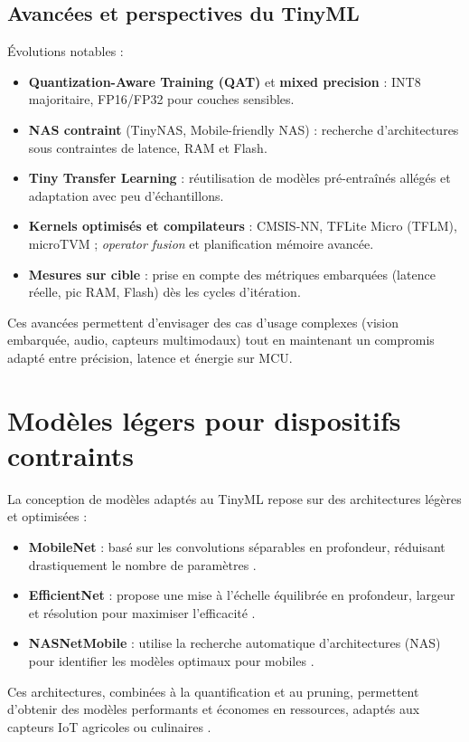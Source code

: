 \subsection{Avancées et perspectives du TinyML}
Évolutions notables :
\begin{itemize}
    \item \textbf{Quantization-Aware Training (QAT)} et \textbf{mixed precision} : INT8 majoritaire, FP16/FP32 pour couches sensibles.
    \item \textbf{NAS contraint} (TinyNAS, Mobile-friendly NAS) : recherche d’architectures sous contraintes de latence, RAM et Flash.
    \item \textbf{Tiny Transfer Learning} : réutilisation de modèles pré-entraînés allégés et adaptation avec peu d’échantillons.
    \item \textbf{Kernels optimisés et compilateurs} : CMSIS-NN, TFLite Micro (TFLM), microTVM ; \emph{operator fusion} et planification mémoire avancée.
    \item \textbf{Mesures sur cible} : prise en compte des métriques embarquées (latence réelle, pic RAM, Flash) dès les cycles d’itération.
\end{itemize}
Ces avancées permettent d’envisager des cas d’usage complexes (vision embarquée, audio, capteurs multimodaux) tout en maintenant un compromis adapté entre précision, latence et énergie sur MCU.

\section{Modèles légers pour dispositifs contraints}
La conception de modèles adaptés au TinyML repose sur des architectures légères et optimisées :
\begin{itemize}
    \item \textbf{MobileNet} : basé sur les convolutions séparables en profondeur, réduisant drastiquement le nombre de paramètres \cite{howard2017mobilenets}.
    \item \textbf{EfficientNet} : propose une mise à l’échelle équilibrée en profondeur, largeur et résolution pour maximiser l’efficacité \cite{tan2019mnasnet}.
    \item \textbf{NASNetMobile} : utilise la recherche automatique d’architectures (NAS) pour identifier les modèles optimaux pour mobiles \cite{zoph2018}.
\end{itemize}
Ces architectures, combinées à la quantification et au pruning, permettent d’obtenir des modèles performants et économes en ressources, adaptés aux capteurs IoT agricoles ou culinaires \cite{moeketsi2025}.

